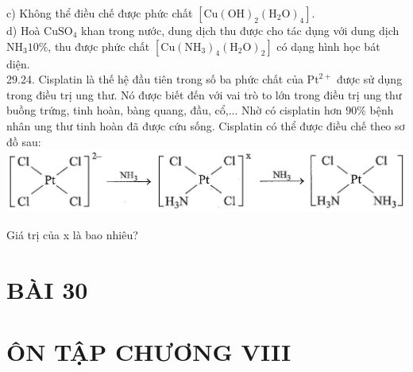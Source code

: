 \documentclass[10pt]{article}
\begin{document}
c) Không thể điều chế được phức chất $\left[\mathrm{Cu}(\mathrm{OH})_{2}\left(\mathrm{H}_{2} \mathrm{O}\right)_{4}\right]$.\\
d) Hoà $\mathrm{CuSO}_{4}$ khan trong nước, dung dịch thu được cho tác dụng với dung dịch $\mathrm{NH}_{3} 10 \%$, thu được phức chất $\left[\mathrm{Cu}\left(\mathrm{NH}_{3}\right)_{4}\left(\mathrm{H}_{2} \mathrm{O}\right)_{2}\right]$ có dạng hình học bát diện.\\
29.24. Cisplatin là thế hệ đầu tiên trong số ba phức chất của $\mathrm{Pt}^{2+}$ được sử dụng trong điều trị ung thư. Nó được biết đến với vai trò to lớn trong điều trị ung thư buồng trứng, tinh hoàn, bàng quang, đầu, cổ,... Nhờ có cisplatin hơn $90 \%$ bệnh nhân ung thư tinh hoàn đã được cứu sống. Cisplatin có thể được điều chế theo sơ đồ sau:\\
\includegraphics[max width=\textwidth, center]{2025_10_23_74efce88ce3a451fd6b0g-109}

Giá trị của x là bao nhiêu?

\section*{BÀI 30}
\section*{ÔN TẬP CHƯƠNG VIII}
\end{document}

